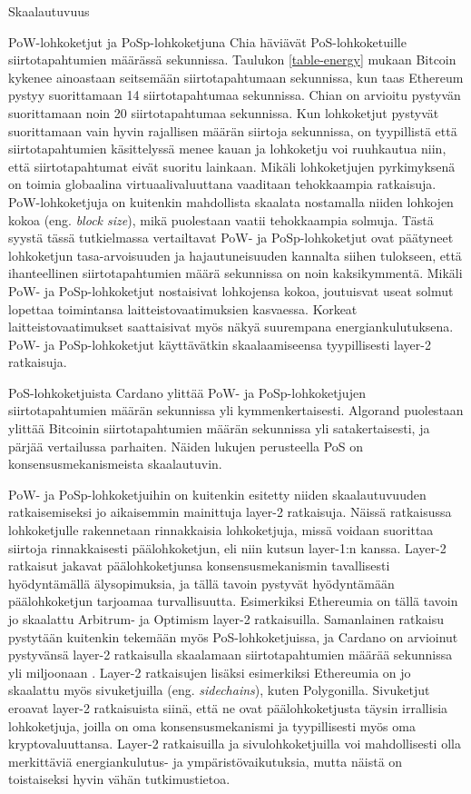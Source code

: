 \begin{section}{Skaalautuvuus\label{skaalautuvuus}}

PoW-lohkoketjut ja PoSp-lohkoketjuna Chia häviävät PoS-lohkoketuille siirtotapahtumien määrässä sekunnissa. Taulukon \ref{table-energy} mukaan Bitcoin kykenee ainoastaan seitsemään siirtotapahtumaan sekunnissa, kun taas Ethereum pystyy suorittamaan 14 siirtotapahtumaa sekunnissa. Chian on arvioitu pystyvän suorittamaan noin 20 siirtotapahtumaa sekunnissa. Kun lohkoketjut pystyvät suorittamaan vain hyvin rajallisen määrän siirtoja sekunnissa, on tyypillistä että siirtotapahtumien käsittelyssä menee kauan ja lohkoketju voi ruuhkautua niin, että siirtotapahtumat eivät suoritu lainkaan. Mikäli lohkoketjujen pyrkimyksenä on toimia globaalina virtuaalivaluuttana vaaditaan tehokkaampia ratkaisuja. PoW-lohkoketjuja on kuitenkin mahdollista skaalata nostamalla niiden lohkojen kokoa (eng. \textit{block size}), mikä puolestaan vaatii tehokkaampia solmuja. Tästä syystä tässä tutkielmassa vertailtavat PoW- ja PoSp-lohkoketjut ovat päätyneet lohkoketjun tasa-arvoisuuden ja hajautuneisuuden kannalta siihen tulokseen, että ihanteellinen siirtotapahtumien määrä sekunnissa on noin kaksikymmentä. Mikäli PoW- ja PoSp-lohkoketjut nostaisivat lohkojensa kokoa, joutuisvat useat solmut lopettaa toimintansa laitteistovaatimuksien kasvaessa. Korkeat laitteistovaatimukset saattaisivat myös näkyä suurempana energiankulutuksena. PoW- ja PoSp-lohkoketjut käyttävätkin skaalaamiseensa tyypillisesti layer-2 ratkaisuja.

PoS-lohkoketjuista Cardano ylittää PoW- ja PoSp-lohkoketjujen siirtotapahtumien määrän sekunnissa yli kymmenkertaisesti. Algorand puolestaan ylittää Bitcoinin siirtotapahtumien määrän sekunnissa yli satakertaisesti, ja pärjää vertailussa parhaiten. Näiden lukujen perusteella PoS on konsensusmekanismeista skaalautuvin.

PoW- ja PoSp-lohkoketjuihin on kuitenkin esitetty niiden skaalautuvuuden ratkaisemiseksi jo aikaisemmin mainittuja layer-2 ratkaisuja. Näissä ratkaisussa lohkoketjulle rakennetaan rinnakkaisia lohkoketjuja, missä voidaan suorittaa siirtoja rinnakkaisesti päälohkoketjun, eli niin kutsun layer-1:n kanssa. Layer-2 ratkaisut jakavat päälohkoketjunsa konsensusmekanismin tavallisesti hyödyntämällä älysopimuksia, ja tällä tavoin pystyvät hyödyntämään päälohkoketjun tarjoamaa turvallisuutta. Esimerkiksi Ethereumia on tällä tavoin jo skaalattu Arbitrum- ja Optimism layer-2 ratkaisuilla. Samanlainen ratkaisu pystytään kuitenkin tekemään myös PoS-lohkoketjuissa, ja Cardano on arvioinut pystyvänsä layer-2 ratkaisulla skaalamaan siirtotapahtumien määrää sekunnissa yli miljoonaan \cite{cardano-hydra}. Layer-2 ratkaisujen lisäksi esimerkiksi Ethereumia on jo skaalattu myös sivuketjuilla (eng. \textit{sidechains}), kuten Polygonilla. Sivuketjut eroavat layer-2 ratkaisuista siinä, että ne ovat päälohkoketjusta täysin irrallisia lohkoketjuja, joilla on oma konsensusmekanismi ja tyypillisesti myös oma kryptovaluuttansa. Layer-2 ratkaisuilla ja sivulohkoketjuilla voi mahdollisesti olla merkittäviä energiankulutus- ja ympäristövaikutuksia, mutta näistä on toistaiseksi hyvin vähän tutkimustietoa.


\end{section}
